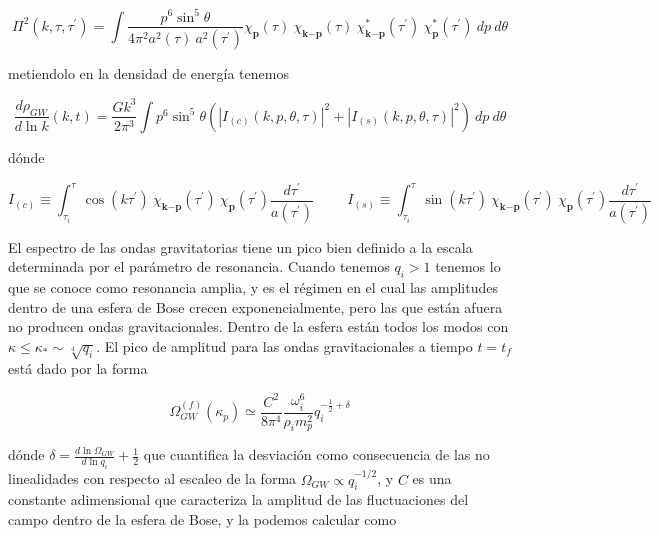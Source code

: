\begin{equation}
    \Pi^2 (k, \tau, \tau^\prime) = \int \frac{p^6 \sin^5 \theta}{4 \pi^2 a^2 (\tau) \ a^2 (\tau^\prime)} \chi_\textbf{p} (\tau) \ \chi_{\textbf{k} - \textbf{p}} (\tau) \ \chi_{\textbf{k} - \textbf{p}}^* (\tau^\prime) \ \chi^*_\textbf{p} (\tau^\prime) \ dp \ d\theta
\end{equation}

\noindent
metiendolo en la densidad de energía tenemos

\begin{equation}
    \frac{d \rho_{GW}}{d \ln k} (k, t) = \frac{G k^3}{2 \pi^3} \int p^6 \sin^5 \theta \left( \left| I_{(c)} (k, p, \theta, \tau) \right|^2 + \left| I_{(s)} (k, p, \theta, \tau) \right|^2 \right) \ dp \ d\theta
\end{equation}

\noindent
dónde 

\begin{equation}
    I_{(c)} \equiv \int_{\tau_i}^\tau \cos (k \tau^\prime) \ \chi_{\textbf{k} - \textbf{p}} (\tau^\prime) \ \chi_\textbf{p} (\tau^\prime) \frac{d\tau^\prime}{a(\tau^\prime)} \hspace{1cm} I_{(s)} \equiv \int_{\tau_i}^\tau \sin (k \tau^\prime) \ \chi_{\textbf{k} - \textbf{p}} (\tau^\prime) \ \chi_\textbf{p} (\tau^\prime) \frac{d\tau^\prime}{a(\tau^\prime)}
\end{equation}

El espectro de las ondas gravitatorias tiene un pico bien definido a la escala determinada por el parámetro de resonancia. Cuando tenemos $q_i > 1$ tenemos lo que se conoce como resonancia amplia, y es el régimen en el cual las amplitudes dentro de una esfera de Bose crecen exponencialmente, pero las que están afuera no producen ondas gravitacionales. Dentro de la esfera están todos los modos con $\kappa \leq \kappa_* \sim \sqrt[4]{q_i}$. El pico de amplitud para las ondas gravitacionales a tiempo $t = t_f$ está dado por la forma

\begin{equation}
    \Omega_{GW}^{(f)} (\kappa_p) \simeq \frac{C^2}{8 \pi^4} \frac{\omega_i^6}{\rho_i m_{p}^2} q_i^{\displaystyle - \frac{1}{2} + \delta}
\end{equation}

\noindent
dónde $\displaystyle \delta = \frac{d \ln \Omega_{GW}}{d \ln q_i} + \frac{1}{2}$ que cuantifica la desviación como consecuencia de las no linealidades con respecto al escaleo de la forma $\Omega_{GW} \propto q_i^{ - 1/2}$, y $C$ es una constante adimensional que caracteriza la amplitud de las fluctuaciones del campo dentro de la esfera de Bose, y la podemos calcular como 

